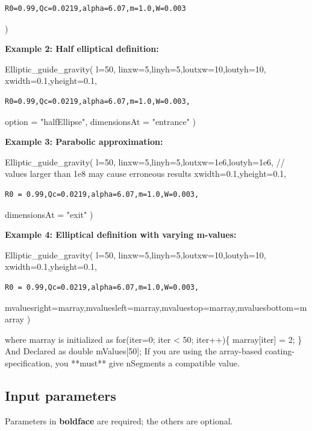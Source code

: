 \begin{verbatim}
R0=0.99,Qc=0.0219,alpha=6.07,m=1.0,W=0.003
\end{verbatim}

)

\textbf{Example 2: Half elliptical definition:}

Elliptic\_guide\_gravity( l=50, linxw=5,linyh=5,loutxw=10,loutyh=10, xwidth=0.1,yheight=0.1,

\begin{verbatim}
R0=0.99,Qc=0.0219,alpha=6.07,m=1.0,W=0.003,
\end{verbatim}

option = "halfEllipse", dimensionsAt = "entrance" )

\textbf{Example 3: Parabolic approximation:}

Elliptic\_guide\_gravity( l=50, linxw=5,linyh=5,loutxw=1e6,loutyh=1e6, // values larger than 1e8 may cause erroneous results xwidth=0.1,yheight=0.1,

\begin{verbatim}
R0 = 0.99,Qc=0.0219,alpha=6.07,m=1.0,W=0.003,
\end{verbatim}

dimensionsAt = "exit" )

\textbf{Example 4: Elliptical definition with varying m-values:}

Elliptic\_guide\_gravity( l=50, linxw=5,linyh=5,loutxw=10,loutyh=10, xwidth=0.1,yheight=0.1,

\begin{verbatim}
R0 = 0.99,Qc=0.0219,alpha=6.07,m=1.0,W=0.003,
\end{verbatim}

mvaluesright=marray,mvaluesleft=marray,mvaluestop=marray,mvaluesbottom=marray )

where marray is initialized as for(iter=0; iter \textless{} 50; iter++)\{ marray[iter] = 2; \} And Declared as double mValues[50]; If you are using the array-based coating-specification, you **must** give nSegments a compatible value.

\subsection*{Input parameters}
Parameters in \textbf{boldface} are required; the others are optional.

